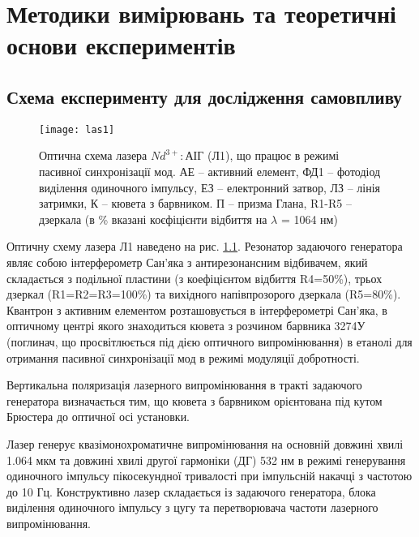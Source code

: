 \newpage

\chapter{Методики вимірювань та теоретичні основи експериментів}

\section{Схема експерименту для дослідження самовпливу}\label{sec:L1}

\begin{figure}
\centering
\texttt{[image: las1]}
\caption{Оптична схема лазера $Nd^{3+}:\text{АІГ}$ (Л1), що працює в режимі
пасивної синхронізації мод. АЕ -- активний елемент, ФД1 -- фотодіод
виділення одиночного імпульсу, ЕЗ -- електронний затвор, ЛЗ -- лінія
затримки, К -- кювета з барвником. П -- призма Глана, R1-R5 -- дзеркала
(в \% вказані коєфіцієнти відбиття на $\lambda$ = 1064 нм)}\label{fig:las1}
\end{figure}

Оптичну схему лазера Л1 наведено на рис. \ref{fig:las1}.
Резонатор задаючого генератора являє собою інтерферометр Сан'яка з антирезонансним
відбивачем, який складається з подільної пластини (з коефіцієнтом відбиття R4=50\%),
трьох дзеркал (R1=R2=R3=100\%) та вихідного напівпрозорого
дзеркала (R5=80\%). Квантрон з активним елементом розташовується в інтерферометрі Сан'яка,
в оптичному центрі якого знаходиться кювета з
розчином барвника 3274У (поглинач, що просвітлюється під дією оптичного
випромінювання) в етанолі для отримання пасивної синхронізації мод в режимі модуляції добротності.

Вертикальна поляризація лазерного випромінювання в тракті задаючого генератора визначається тим, що кювета
з барвником орієнтована під кутом Брюстера до оптичної осі установки.

Лазер генерує квазімонохроматичне випромінювання на основній
довжині хвилі 1.064 мкм та довжині хвилі другої гармоніки (ДГ) 532 нм в
режимі генерування одиночного імпульсу пікосекундної тривалості при
імпульсній накачці з частотою до 10 Гц. Конструктивно лазер складається із
задаючого генератора, блока виділення одиночного імпульсу з цугу та
перетворювача частоти лазерного випромінювання. 



